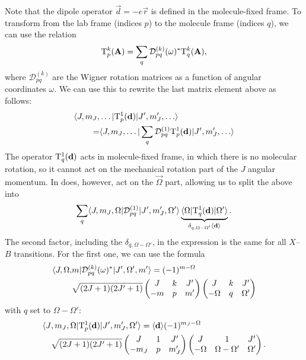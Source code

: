 Note that the dipole operator $\vec d=-e\vec r$ is defined in the molecule-fixed
frame. To transform from the lab frame (indices $p$) to the molecule frame
(indices $q$), we can use the relation \cite[eqn~5.182]{brown2003rotational}
%
\[
    \mathrm{T}_p^k(\mathbf{A})
    =
    \sum\limits_q\mathcal D_{pq}^{(k)}(\omega)^*
    \mathrm{T}_q^k(\mathbf{A}),
\]
%
where $\mathcal D_{pq}^{(k)}$ are the Wigner rotation matrices as a function of
angular coordinates $\omega$. We can use this to rewrite the last matrix element
above as follows:
%
\begin{align*}
    \langle J,m_J,&\ldots|\mathrm{T}_p^1(\mathbf{d})|J',m_J',\ldots\rangle
    \\=
    &\langle J,m_J,\ldots|\sum_q\mathcal D_{pq}^{(1)}\mathrm{T}_p^1(\mathbf{d})|J',m_J',\ldots\rangle
\end{align*}
%
The operator $\mathrm{T}_q^1(\mathbf{d})$ acts in molecule-fixed frame, in which there
is no molecular rotation, so it cannot act on the mechanical rotation part of
the $J$ angular momentum. In does, however, act on the $\vec \Omega$ part,
allowing us to split the above into
%
\begin{align*}
    \sum_q
    \langle J,m_J,\Omega|\mathcal D_{pq}^{(1)}|J',m_J',\Omega'\rangle
    \underbrace{
        \langle\Omega|\mathrm{T}^1_q(\mathbf{d})|\Omega'\rangle
    }_{\delta_{q,\Omega-\Omega'}\langle \mathbf{d}\rangle}.
\end{align*}
%
The second factor, including the $\delta_{q,\Omega-\Omega'}$, in the expression
is the same for all $X$--$B$ transitions. For the first one, we can use the
formula \cite[eqn~5.184]{brown2003rotational}
%
\begin{align*}
    \langle J,\Omega,&m|\mathcal D_{pq}^{(k)}(\omega)^*|J',\Omega',m'\rangle
    =
    (-1)^{m-\Omega}\\
    &\sqrt{(2J+1)(2J'+1)}
    \begin{pmatrix}J&k&J'\\-m&p&m'\end{pmatrix}
    \begin{pmatrix}J&k&J'\\-\Omega&q&\Omega'\end{pmatrix}
\end{align*}
%
with $q$ set to $\Omega-\Omega'$:
\begin{align}
    \label{userotation}
        \langle J&,m_J,\Omega|\mathrm{T}_p^1(\mathbf{d})|J',m_J',\Omega'\rangle
        =\langle \mathbf{d}\rangle(-1)^{m_J-\Omega}\\\nonumber
        &\sqrt{(2J+1)(2J'+1)}
        \begin{pmatrix}J&1&J'\\-m_J&p&m_J'\end{pmatrix}
        \begin{pmatrix}J&1&J'\\-\Omega&\Omega-\Omega'&\Omega'\end{pmatrix}.
\end{align}


